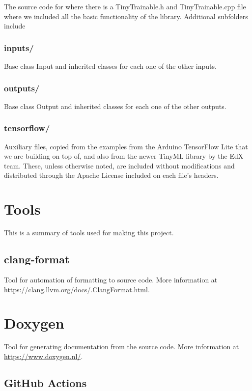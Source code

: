 The source code for where there is a TinyTrainable.h and TinyTrainable.cpp file where we included all the basic functionality of the library. Additional subfolders include

\subsubsection{inputs/}

Base class Input and inherited classes for each one of the other inputs.

\subsubsection{outputs/}

Base class Output and inherited classes for each one of the other outputs.

\subsubsection{tensorflow/}

Auxiliary files, copied from the examples from the Arduino TensorFlow Lite that we are building on top of, and also from the newer TinyML library by the EdX team. These, unless otherwise noted, are included without modifications and distributed through the Apache License included on each file's headers.

\section{Tools}

This is a summary of tools used for making this project.

\subsection{clang-format}

Tool for automation of formatting to source code. More information at \url{https://clang.llvm.org/docs/.ClangFormat.html}.

\section{Doxygen}

Tool for generating documentation from the source code. More information at \url{https://www.doxygen.nl/}.

\subsection{GitHub Actions}

